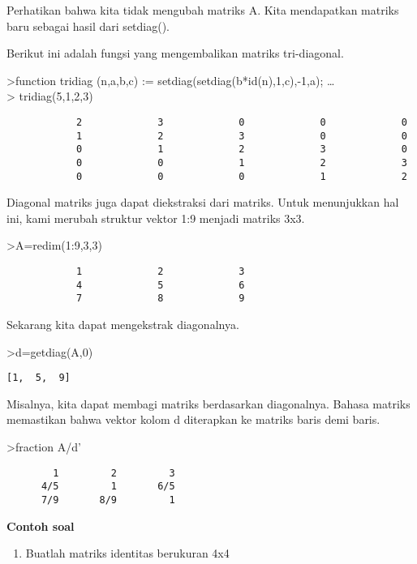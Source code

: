\documentclass[
]{book}
\providecommand{\tightlist}{%
  \setlength{\itemsep}{0pt}\setlength{\parskip}{0pt}}
\begin{document}
Perhatikan bahwa kita tidak mengubah matriks A. Kita mendapatkan matriks baru sebagai hasil dari setdiag().

Berikut ini adalah fungsi yang mengembalikan matriks tri-diagonal.

\textgreater function tridiag (n,a,b,c) := setdiag(setdiag(b*id(n),1,c),-1,a); \ldots{}\\
\textgreater{} tridiag(5,1,2,3)

\begin{verbatim}
            2             3             0             0             0 
            1             2             3             0             0 
            0             1             2             3             0 
            0             0             1             2             3 
            0             0             0             1             2 
\end{verbatim}

Diagonal matriks juga dapat diekstraksi dari matriks. Untuk menunjukkan hal ini, kami merubah struktur vektor 1:9 menjadi matriks 3x3.

\textgreater A=redim(1:9,3,3)

\begin{verbatim}
            1             2             3 
            4             5             6 
            7             8             9 
\end{verbatim}

Sekarang kita dapat mengekstrak diagonalnya.

\textgreater d=getdiag(A,0)

\begin{verbatim}
[1,  5,  9]
\end{verbatim}

Misalnya, kita dapat membagi matriks berdasarkan diagonalnya. Bahasa matriks memastikan bahwa vektor kolom d diterapkan ke matriks baris demi baris.

\textgreater fraction A/d'

\begin{verbatim}
        1         2         3 
      4/5         1       6/5 
      7/9       8/9         1 
\end{verbatim}

\textbf{Contoh soal}

\begin{enumerate}
\def\labelenumi{\arabic{enumi}.}
\tightlist
\item
  Buatlah matriks identitas berukuran 4x4
\end{enumerate}
\end{document}
